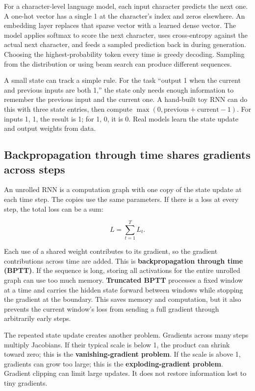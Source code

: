 For a character-level language model, each input character predicts the next one. A one-hot vector has a single 1 at the character's index and zeros elsewhere. An embedding layer replaces that sparse vector with a learned dense vector. The model applies softmax to score the next character, uses cross-entropy against the actual next character, and feeds a sampled prediction back in during generation. Choosing the highest-probability token every time is greedy decoding. Sampling from the distribution or using beam search can produce different sequences.

A small state can track a simple rule. For the task ``output 1 when the current and previous inputs are both 1,'' the state only needs enough information to remember the previous input and the current one. A hand-built toy RNN can do this with three state entries, then compute \(\max(0,\text{previous}+\text{current}-1)\). For inputs 1, 1, the result is 1; for 1, 0, it is 0. Real models learn the state update and output weights from data.

\subsection{Backpropagation through time shares gradients across steps}\label{04-visual-computing-ii-ch031-backpropagation-through-time-shares-gradients-across-steps}

An unrolled RNN is a computation graph with one copy of the state update at each time step. The copies use the same parameters. If there is a loss at every step, the total loss can be a sum:

\[L=\sum_{t=1}^{T} L_t.\]

Each use of a shared weight contributes to its gradient, so the gradient contributions across time are added. This is \textbf{backpropagation through time (BPTT)}. If the sequence is long, storing all activations for the entire unrolled graph can use too much memory. \textbf{Truncated BPTT} processes a fixed window at a time and carries the hidden state forward between windows while stopping the gradient at the boundary. This saves memory and computation, but it also prevents the current window's loss from sending a full gradient through arbitrarily early steps.

The repeated state update creates another problem. Gradients across many steps multiply Jacobians. If their typical scale is below 1, the product can shrink toward zero; this is the \textbf{vanishing-gradient problem}. If the scale is above 1, gradients can grow too large; this is the \textbf{exploding-gradient problem}. Gradient clipping can limit large updates. It does not restore information lost to tiny gradients.

